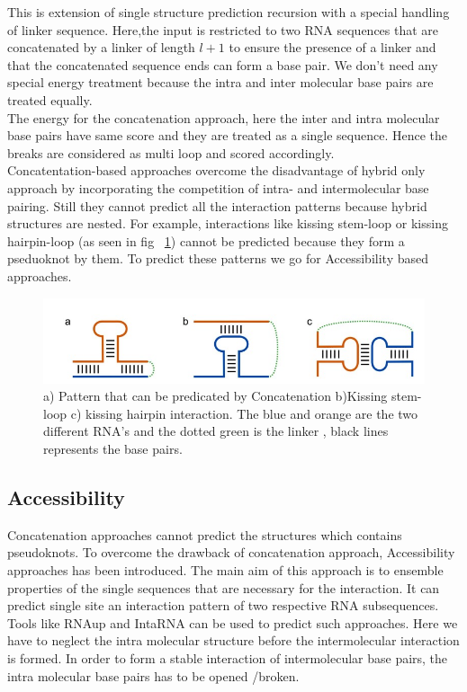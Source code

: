 \documentclass[twoside,a4paper]{report}
\begin{document}
	This is extension of single structure prediction recursion with a special handling of linker sequence. Here,the input is restricted to two RNA sequences that are concatenated by a linker of length $l+1$  to ensure the presence of a linker and that the concatenated sequence ends can form a base pair. We don't need any special energy treatment because the intra and inter molecular base pairs are treated equally.\\

	The energy for the concatenation approach, here the inter and intra molecular base pairs have same score and they are treated as a single sequence. Hence the breaks are considered as multi loop and scored accordingly. \\
		
	Concatentation-based approaches overcome the disadvantage of hybrid only approach by incorporating the competition of intra- and intermolecular base pairing. Still they cannot predict all the interaction patterns because  hybrid structures are nested. For example, interactions like kissing stem-loop or kissing hairpin-loop (as seen in fig ~\ref{fig:concat}) cannot be predicted because they form a pseduoknot by them. To predict these patterns we go for Accessibility based approaches.\\
	 \begin{figure}[tb]
		\includegraphics[width=0.9\linewidth]{concat}
		\centering
		\caption{a) Pattern that can be predicated by Concatenation b)Kissing stem-loop c) kissing hairpin interaction. The blue and orange are the two different RNA's and the dotted green is the linker , black lines represents the base pairs. } 
		\label{fig:concat}
	\end{figure}
	
	
	\subsection{Accessibility}
	Concatenation approaches cannot predict the structures which contains pseudoknots. To overcome the drawback of concatenation approach, Accessibility approaches has been introduced. The main aim of this approach is to ensemble properties of the single sequences that are necessary for the interaction.  It can predict single site an interaction pattern of two respective RNA subsequences. Tools like RNAup and IntaRNA can be used to predict such approaches. Here we have to neglect the intra molecular structure before the intermolecular interaction is formed. In order to form a stable interaction of intermolecular base pairs, the intra molecular base pairs has to be opened /broken. \\
	
\end{document}
